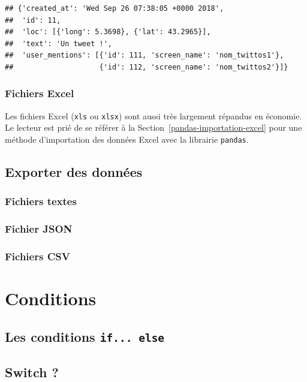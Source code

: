 \documentclass[12pt,]{book}
\numberwithin{equation}{section}
\numberwithin{countremarque}{section}
\begin{document}
\begin{lstlisting}
## {'created_at': 'Wed Sep 26 07:38:05 +0000 2018',
##  'id': 11,
##  'loc': [{'long': 5.3698}, {'lat': 43.2965}],
##  'text': 'Un tweet !',
##  'user_mentions': [{'id': 111, 'screen_name': 'nom_twittos1'},
##                    {'id': 112, 'screen_name': 'nom_twittos2'}]}
\end{lstlisting}

\subsection{Fichiers Excel}\label{fichiers-excel}

Les fichiers Excel (\texttt{xls} ou \texttt{xlsx}) sont aussi très
largement répandus en économie. Le lecteur est prié de se référer à la
Section~\ref{pandas-importation-excel} pour une méthode d'importation
des données Excel avec la librairie \texttt{pandas}.

\section{Exporter des données}\label{exporter-des-donnees}

\subsection{Fichiers textes}\label{fichiers-textes}

\subsection{Fichier JSON}\label{fichier-json-1}

\subsection{Fichiers CSV}\label{fichiers-csv-1}

\chapter{Conditions}\label{conditions}

\section{\texorpdfstring{Les conditions
\texttt{if...\ else}}{Les conditions if... else}}\label{les-conditions-if...-else}

\section{Switch ?}\label{switch}
\end{document}
